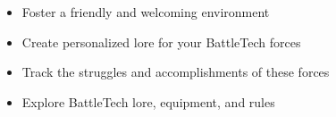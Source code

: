 \begin{itemize}

  \item Foster a friendly and welcoming environment

  \item Create personalized lore for your BattleTech forces

  \item Track the struggles and accomplishments of these forces

  \item Explore BattleTech lore, equipment, and rules

\end{itemize}
